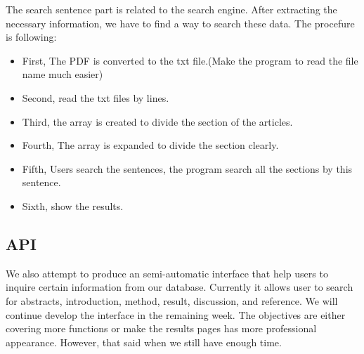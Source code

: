 The search sentence part is related to the search engine.
After extracting the necessary information, we have to find a way to search these data.
The procefure is following:
\begin{itemize}
	
	\item First, The PDF is converted to the txt file.(Make the program to read the file name much easier)
	\item Second, read the txt files by lines.
	\item Third, the array is created to divide the section of the articles.
	\item Fourth, The array is expanded to divide the section clearly.
	\item Fifth, Users search the sentences, the program search all the sections by this sentence.
	\item Sixth, show the results.
	
\end{itemize}
\subsection{API}
We also attempt to produce an semi-automatic interface that help users to inquire certain information from our database. 
Currently it allows user to search for abstracts, introduction, method, result, discussion, and reference. We will continue develop the interface in the remaining week. 
The objectives are either covering more functions or make the results pages has more professional appearance. However, that
said when we still have enough time.


\newpage %


\newpage %